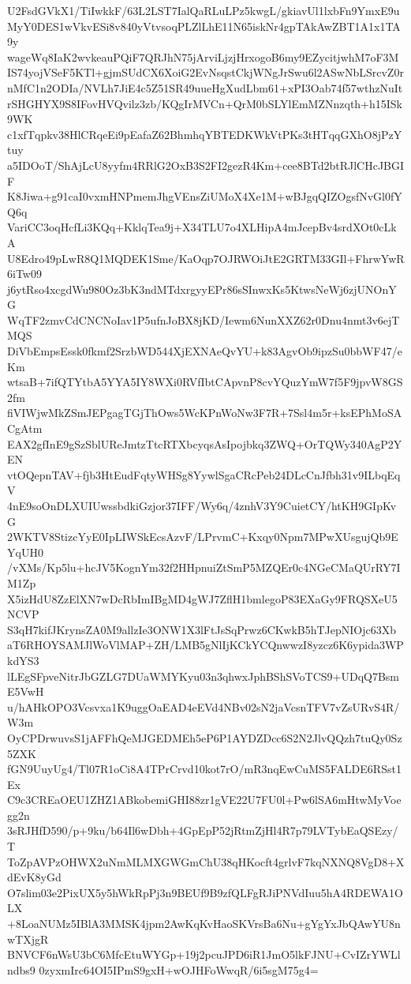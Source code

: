 U2FsdGVkX1/TiIwkkF/63L2LST7IalQaRLuLPz5kwgL/gkiavUl1lxbFn9YmxE9u
MyY0DES1wVkvESi8v840yVtvsoqPLZlLhE11N65iskNr4gpTAkAwZBT1A1x1TA9y
wageWq8IaK2wvkeauPQiF7QRJhN75jArviLjzjHrxogoB6my9EZycitjwhM7oF3M
IS74yojVSeF5KTl+gjmSUdCX6XoiG2EvNsqstCkjWNgJrSwu6l2ASwNbLSrcvZ0r
nMfC1n2ODIa/NVLh7JiE4c5Z51SR49uueHgXudLbm61+xPI3Oab74f57wthzNuIt
rSHGHYX9S8IFovHVQvilz3zb/KQgIrMVCn+QrM0bSLYlEmMZNnzqth+h15ISk9WK
c1xfTqpkv38HlCRqeEi9pEafaZ62BhmhqYBTEDKWkVtPKs3tHTqqGXhO8jPzYtuy
a5IDOoT/ShAjLcU8yyfm4RRlG2OxB3S2FI2gezR4Km+cee8BTd2btRJlCHcJBGIF
K8Jiwa+g91caI0vxmHNPmemJhgVEnsZiUMoX4Xe1M+wBJgqQIZOgsfNvGl0fYQ6q
VariCC3oqHcfLi3KQq+KklqTea9j+X34TLU7o4XLHipA4mJcepBv4srdXOt0cLkA
U8Edro49pLwR8Q1MQDEK1Sme/KaOqp7OJRWOiJtE2GRTM33GIl+FhrwYwR6iTw09
j6ytRso4xcgdWu980Oz3bK3ndMTdxrgyyEPr86sSInwxKs5KtwsNeWj6zjUNOnYG
WqTF2zmvCdCNCNoIav1P5ufnJoBX8jKD/Iewm6NunXXZ62r0Dnu4nmt3v6ejTMQS
DiVbEmpsEssk0fkmf2SrzbWD544XjEXNAeQvYU+k83AgvOb9ipzSu0bbWF47/eKm
wtsaB+7ifQTYtbA5YYA5IY8WXi0RVfIbtCApvnP8cvYQuzYmW7f5F9jpvW8GS2fm
fiVIWjwMkZSmJEPgagTGjThOws5WcKPnWoNw3F7R+7Ssl4m5r+ksEPhMoSACgAtm
EAX2gfInE9gSzSblUReJmtzTtcRTXbcyqsAsIpojbkq3ZWQ+OrTQWy340AgP2YEN
vtOQepnTAV+fjb3HtEudFqtyWHSg8YywlSgaCRcPeb24DLcCnJfbh31v9ILbqEqV
4nE9soOnDLXUIUwssbdkiGzjor37IFF/Wy6q/4znhV3Y9CuietCY/htKH9GIpKvG
2WKTV8StizcYyE0IpLIWSkEcsAzvF/LPrvmC+Kxqy0Npm7MPwXUsgujQb9EYqUH0
/vXMs/Kp5lu+hcJV5KognYm32f2HHpnuiZtSmP5MZQEr0c4NGeCMaQUrRY7IM1Zp
X5izHdU8ZzElXN7wDcRbImIBgMD4gWJ7ZflH1bmlegoP83EXaGy9FRQSXeU5NCVP
S3qH7kifJKrynsZA0M9allzIe3ONW1X3lFtJsSqPrwz6CKwkB5hTJepNIOjc63Xb
aT6RHOYSAMJlWoVlMAP+ZH/LMB5gNlIjKCkYCQnwwzI8yzcz6K6ypida3WPkdYS3
lLEgSFpveNitrJbGZLG7DUaWMYKyu03n3qhwxJphBShSVoTCS9+UDqQ7BsmE5VwH
u/hAHkOPO3Vcsvxa1K9uggOaEAD4eEVd4NBv02sN2jaVcsnTFV7vZsURvS4R/W3m
OyCPDrwuvsS1jAFFhQeMJGEDMEh5eP6P1AYDZDcc6S2N2JlvQQzh7tuQy0Sz5ZXK
fGN9UuyUg4/Tl07R1oCi8A4TPrCrvd10kot7rO/mR3nqEwCuMS5FALDE6RSst1Ex
C9c3CREaOEU1ZHZ1ABkobemiGHI88zr1gVE22U7FU0l+Pw6lSA6mHtwMyVoegg2n
3sRJHfD590/p+9ku/b64Il6wDbh+4GpEpP52jRtmZjHl4R7p79LVTybEaQSEzy/T
ToZpAVPzOHWX2uNmMLMXGWGmChU38qHKocft4grlvF7kqNXNQ8VgD8+XdEvK8yGd
O7slim03e2PixUX5y5hWkRpPj3n9BEUf9B9zfQLFgRJiPNVdIuu5hA4RDEWA1OLX
+8LoaNUMz5IBlA3MMSK4jpm2AwKqKvHaoSKVrsBa6Nu+gYgYxJbQAwYU8nwTXjgR
BNVCF6nWsU3bC6MfcEtuWYGp+19j2pcuJPD6iR1JmO5lkFJNU+CvIZrYWLlndbs9
0zyxmIrc64OI5IPmS9gxH+wOJHFoWwqR/6i5sgM75g4=
